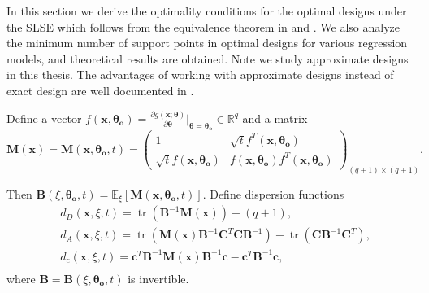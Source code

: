 \documentclass[
]{book}
\theoremstyle{definition}
\theoremstyle{definition}
\theoremstyle{definition}
\theoremstyle{definition}
\theoremstyle{remark}
\begin{document}
In this section we derive the optimality conditions for the optimal designs under the SLSE which follows from the equivalence theorem in \citet{kiefer-wolfowitz1959optimum} and \citet{kiefer1974general}. We also analyze the minimum number of support points in optimal designs for various regression models, and theoretical results are obtained. Note we study approximate designs in this thesis. The advantages of working with approximate designs instead of exact design are well documented in \citet{kiefer1985jack}.

Define a vector \(f(\boldsymbol{x,\theta_o})=\frac{\partial g(\boldsymbol{x};\boldsymbol{\theta})}{ \partial \boldsymbol{\theta}}\Big|_{\boldsymbol{\theta}=\boldsymbol{\theta_o}} \in \mathbb{R}^q\) and a matrix
\begin{equation}
\boldsymbol{M}(\boldsymbol{x})=\boldsymbol{M}(\boldsymbol{x},\boldsymbol{\theta_o},t)=\begin{pmatrix}
1       &   \sqrt{t}f^T(\boldsymbol{x},\boldsymbol{\theta_o})\\
\sqrt{t}f(\boldsymbol{x},\boldsymbol{\theta_o}) &f(\boldsymbol{x},\boldsymbol{\theta_o})f^T(\boldsymbol{x},\boldsymbol{\theta_o})
\end{pmatrix}_{(q+1)\times (q+1)}.
 \label{eq:M-matrix}
\end{equation}

Then \(\boldsymbol{B}(\xi,\boldsymbol{\theta_o},t)=\mathbb{E}_{\xi}[\boldsymbol{M}(\boldsymbol{x},\boldsymbol{\theta_o},t)]\). Define dispersion functions
\begin{equation} \label{fuction:dispersion}
\begin{aligned}
  &d_D(\boldsymbol{x},\xi,t) = \operatorname{tr}(\boldsymbol{B}^{-1}\boldsymbol{M}(\boldsymbol{x}))-(q+1),\\
  &d_A(\boldsymbol{x},\xi,t) = \operatorname{tr}(\boldsymbol{M}(\boldsymbol{x})\boldsymbol{B}^{-1}\boldsymbol{C}^T\boldsymbol{C}\boldsymbol{B}^{-1})-\operatorname{tr}(\boldsymbol{C}\boldsymbol{B}^{-1}\boldsymbol{C}^T),\\
  &d_c(\boldsymbol{x},\xi,t) = \boldsymbol{c}^T\boldsymbol{B}^{-1}\boldsymbol{M}(\boldsymbol{x})\boldsymbol{B}^{-1}\boldsymbol{c}-\boldsymbol{c}^T\boldsymbol{B}^{-1}\boldsymbol{c},\\
\end{aligned}
\end{equation}
where \(\boldsymbol{B}=\boldsymbol{B}(\xi,\boldsymbol{\theta_o},t)\) is invertible.
\end{document}
